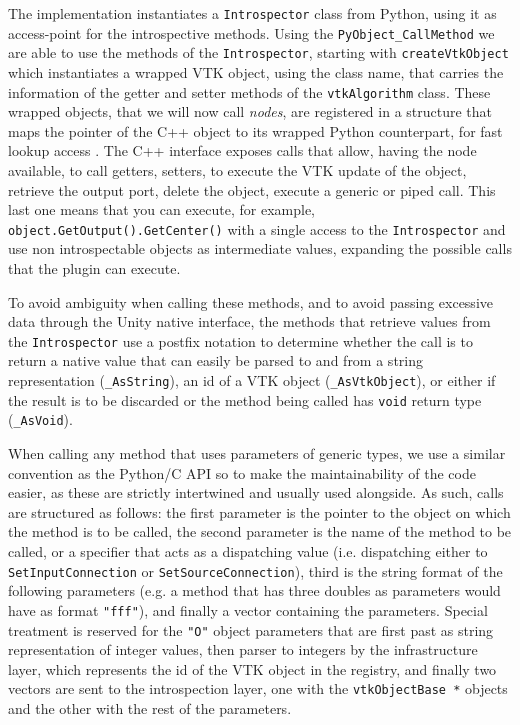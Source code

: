 The implementation instantiates a \verb|Introspector| class from Python, using it as access-point for the introspective methods. Using the \verb|PyObject_CallMethod| we are able to use the methods of the \verb|Introspector|, starting with \verb|createVtkObject| which instantiates a wrapped VTK object, using the class name, that carries the information of the getter and setter methods of the \verb|vtkAlgorithm| class. These wrapped objects, that we will now call \textit{nodes}, are registered in a structure that maps the pointer of the C++ object to its wrapped Python counterpart, for fast lookup access \cite{stdunord16}. The C++ interface exposes calls that allow, having the node available, to call getters, setters, to execute the VTK update of the object, retrieve the output port, delete the object, execute a generic or piped call. This last one means that you can execute, for example, \verb|object.GetOutput().GetCenter()| with a single access to the \verb|Introspector| and use non introspectable objects as intermediate values, expanding the possible calls that the plugin can execute.

To avoid ambiguity when calling these methods, and to avoid passing excessive data through the Unity native interface, the methods that retrieve values from the \verb|Introspector| use a postfix notation to determine whether the call is to return a native value that can easily be parsed to and from a string representation (\verb|_AsString|), an id of a VTK object (\verb|_AsVtkObject|), or either if the result is to be discarded or the method being called has \verb|void| return type (\verb|_AsVoid|).

When calling any method that uses parameters of generic types, we use a similar convention as the Python/C API so to make the maintainability of the code easier, as these are strictly intertwined and usually used alongside. As such, calls are structured as follows: the first parameter is the pointer to the object on which the method is to be called, the second parameter is the name of the method to be called, or a specifier that acts as a dispatching value (i.e. dispatching either to \verb|SetInputConnection| or \verb|SetSourceConnection|), third is the string format of the following parameters (e.g. a method that has three doubles as parameters would have as format \verb|"fff"|), and finally a vector containing the parameters. Special treatment is reserved for the \verb|"O"| object parameters that are first past as string representation of integer values, then parser to integers by the infrastructure layer, which represents the id of the VTK object in the registry, and finally two vectors are sent to the introspection layer, one with the \verb|vtkObjectBase *| objects and the other with the rest of the parameters.

